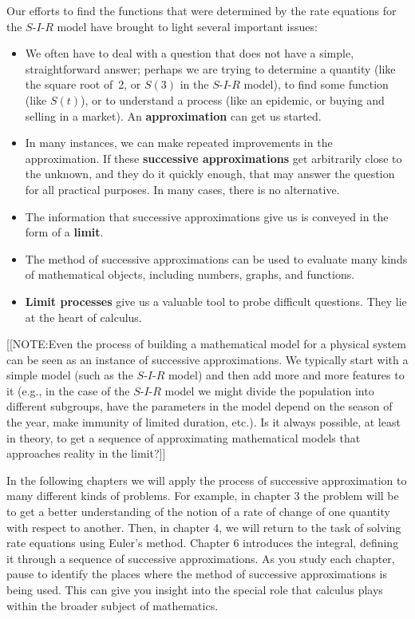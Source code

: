 Our efforts to find the functions that were determined by the rate
 equations for the $S$-$I$-$R$ model have brought to light several
 important issues:
\begin{itemize}

\item We often have to deal with a question that does not have a
 simple, straightforward answer; perhaps we are trying to determine a
 quantity (like the square root of~2, or $S(3)$ in the $S$-$I$-$R$
 model), to find some function (like $S(t)$), or to understand a
 process (like an epidemic, or buying and selling in a market).  An
 {\bf approximation} can get us started.

\item In many instances, we can make repeated improvements in the
 approximation.  If these {\bf successive approximations} get
 arbitrarily close to the unknown, and they do it quickly enough, that
 may answer the question for all practical purposes.  In many cases,
 there is no alternative.

\item The information that successive approximations give us is
 conveyed in the form of a {\bf limit}.

\item The method of successive approximations can be used to evaluate
 many kinds of mathematical objects, including numbers, graphs, and
 functions.

\item {\bf Limit processes} give us a valuable tool to probe difficult
 questions.  They lie at the heart of calculus.

\end{itemize}

[[NOTE:Even the process of building a mathematical model for a
 physical system can be seen as an instance of successive
 approximations.  We typically start with a simple model (such as the
 $S$-$I$-$R$ model) and then add more and more features to it (e.g.,
 in the case of the $S$-$I$-$R$ model we might divide the population
 into different subgroups, have the parameters in the model depend on
 the season of the year, make immunity of limited duration, etc.).  Is
 it always possible, at least in theory, to get a sequence of
 approximating mathematical models that approaches reality in the
 limit?]]


In the following chapters we will apply the process of successive
 approximation to many different kinds of problems.  For example, in
 chapter 3 the problem will be to get a better understanding of the
 notion of a rate of change of one quantity with respect to another.
  Then, in chapter 4, we will return to the task of solving rate
 equations using Euler's method.  Chapter 6 introduces the integral,
 defining it through a sequence of successive approximations.  As you
 study each chapter, pause to identify the places where the method of
 successive approximations is being used.  This can give you insight
 into the special role that calculus plays within the broader subject
 of mathematics.

